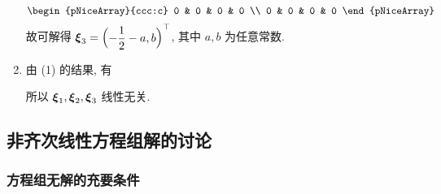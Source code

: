\begin{solution}
\begin{enumerate}[label=(\arabic{*})]
$$\begin{pNiceArray}{ccc:c}
                      0 & 0 & 0 & 0             \\
                      0 & 0 & 0 & 0
                  \end{pNiceArray}$$
              故可解得 $\vb*{\xi}_3=\mqty(-\dfrac{1}{2}-a,b)^\top$, 其中 $a,b$ 为任意常数.
        \item 由 (1) 的结果, 有
              所以 $\vb*{\xi}_1,\vb*{\xi}_2,\vb*{\xi}_3$ 线性无关.
    \end{enumerate}
\end{solution}

\subsection{非齐次线性方程组解的讨论}

\subsubsection{方程组无解的充要条件}

